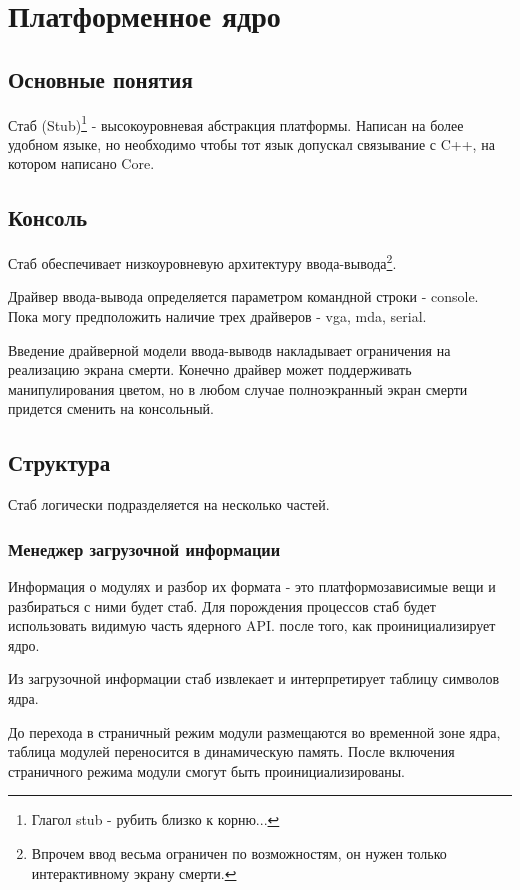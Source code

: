\section{Платформенное ядро}

\subsection{Основные понятия}

Стаб (Stub)\footnote{Глагол stub - рубить близко к корню...} - высокоуровневая
абстракция платформы. Написан на более удобном языке, но необходимо чтобы
тот язык допускал связывание с C++, на котором написано Core.

\subsection{Консоль}

Стаб обеспечивает низкоуровневую архитектуру ввода-вывода\footnote{Впрочем ввод
весьма ограничен по возможностям, он нужен только интерактивному экрану смерти.}.

Драйвер ввода-вывода определяется параметром командной строки - console. Пока
могу предположить наличие трех драйверов - vga, mda, serial.

Введение драйверной модели ввода-выводв накладывает ограничения на реализацию
экрана смерти. Конечно драйвер может поддерживать манипулирования цветом, но в
любом случае полноэкранный экран смерти придется сменить на консольный.

\subsection{Структура}

Стаб логически подразделяется на несколько частей.

\subsubsection{Менеджер загрузочной информации}

Информация о модулях и разбор их формата - это платформозависимые вещи и
разбираться с ними будет стаб. Для порождения процессов стаб будет использовать
видимую часть ядерного API. после того, как проинициализирует ядро.

Из загрузочной информации стаб извлекает и интерпретирует таблицу символов ядра.

До перехода в страничный режим модули размещаются во временной зоне ядра,
таблица модулей переносится в динамическую память. После включения страничного
режима модули смогут быть проинициализированы.

